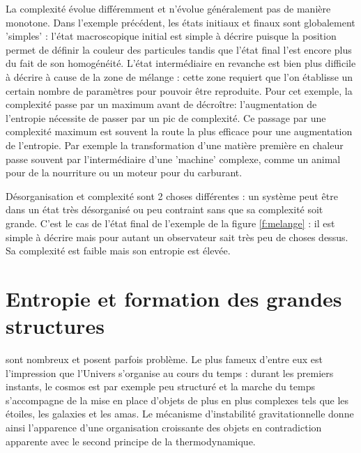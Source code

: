 La complexité évolue différemment et n'évolue généralement pas de manière monotone. Dans l'exemple précédent, les états initiaux et finaux sont globalement 'simples' : l'état macroscopique initial est simple à décrire puisque la position permet de définir la couleur des particules tandis que l'état final l'est encore plus du fait de son homogénéité. L'état intermédiaire en revanche est bien plus difficile à décrire à cause de la zone de mélange : cette zone requiert que l'on établisse un certain nombre de paramètres pour pouvoir être reproduite. Pour cet exemple, la complexité passe par un maximum avant de décroître: l'augmentation de l'entropie nécessite de passer par un pic de complexité. Ce passage par une complexité maximum est souvent la route la plus efficace pour une augmentation de l'entropie. Par exemple la transformation d'une matière première en chaleur passe souvent par l'intermédiaire d'une 'machine' complexe, comme un animal pour de la nourriture ou un moteur pour du carburant.

{Désorganisation et complexité} sont 2 choses différentes : un système peut être dans un état très désorganisé ou peu contraint sans que sa complexité soit grande. C'est le cas de l'état final de l'exemple de la figure \ref{f:melange} : il est simple à décrire mais pour autant un observateur sait très peu de choses dessus. Sa complexité est faible mais son entropie est élevée. 

\section{Entropie et formation des grandes structures}
 sont nombreux et posent parfois problème. Le plus fameux d'entre eux est l'impression que l'Univers s'organise au cours du temps : durant les premiers instants, le cosmos est par exemple peu structuré et la marche du temps s'accompagne de la mise en place d'objets de plus en plus complexes tels que les étoiles, les galaxies et les amas. Le mécanisme d'instabilité gravitationnelle donne ainsi l'apparence d'une organisation croissante des objets en contradiction apparente avec le second principe de la thermodynamique. 

